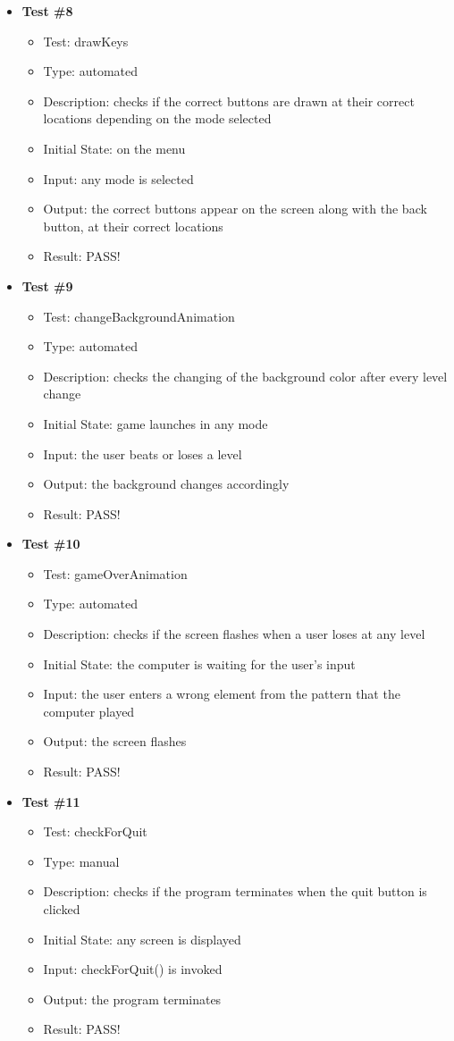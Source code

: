 \documentclass[12pt, titlepage]{article}
\begin{document}
\begin{itemize}
\begin{itemize}
\item \textbf {Test \#8}
\begin{itemize}
\item{Test: drawKeys}
\item{Type: automated}
\item{Description: checks if the correct buttons are drawn at their correct locations depending on the mode selected}
\item{Initial State: on the menu}
\item{Input: any mode is selected}
\item{Output: the correct buttons appear on the screen along with the back button, at their correct locations}
\item{Result: PASS!}
\end{itemize}

\item \textbf {Test \#9}
\begin{itemize}
\item{Test: changeBackgroundAnimation}
\item{Type: automated}
\item{Description: checks the changing of the background color after every level change}
\item{Initial State: game launches in any mode}
\item{Input: the user beats or loses a level}
\item{Output: the background changes accordingly}
\item{Result: PASS!}
\end{itemize}

\item \textbf {Test \#10}
\begin{itemize}
\item{Test: gameOverAnimation}
\item{Type: automated}
\item{Description: checks if the screen flashes when a user loses at any level}
\item{Initial State: the computer is waiting for the user's input}
\item{Input: the user enters a wrong element from the pattern that the computer played}
\item{Output: the screen flashes}
\item{Result: PASS!}
\end{itemize}

\item \textbf {Test \#11}
\begin{itemize}
\item{Test: checkForQuit}
\item{Type: manual}
\item{Description: checks if the program terminates when the quit button is clicked}
\item{Initial State: any screen is displayed}
\item{Input: checkForQuit() is invoked}
\item{Output: the program terminates}
\item{Result: PASS!}
\end{itemize}


\end{itemize}
\end{itemize}
\end{document}
